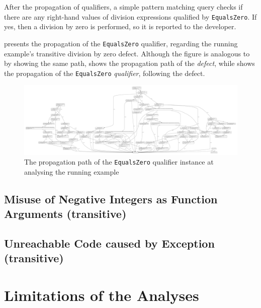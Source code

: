 After the propagation of qualifiers, a simple pattern matching query checks if there are any right-hand values of division expressions qualified by \lstinline{EqualsZero}. If yes, then a division by zero is performed, so it is reported to the developer.

 presents the propagation of the \lstinline{EqualsZero} qualifier, regarding the running example's transitive division by zero defect. Although the figure is analogous to  by showing the same path,  shows the propagation path of the \emph{defect}, while  shows the propagation of the \lstinline{EqualsZero} \emph{qualifier}, following the defect.

\begin{figure}
  \centering
	\includegraphics[width=\textwidth, trim=12mm 12mm 12mm 12mm,clip]{figures/analysis_divisionByZero_transitive.pdf}
  \caption{The propagation path of the \lstinline{EqualsZero} qualifier instance at analysing the running example}
  \label{fig:divisionbyzero-transitive}
\end{figure}


\subsection{Misuse of Negative Integers as Function Arguments (transitive)}

\subsection{Unreachable Code caused by Exception (transitive)}


\section{Limitations of the Analyses}